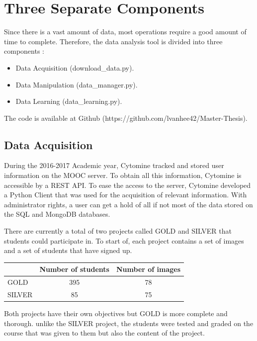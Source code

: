 \documentclass[a4paper,11pt]{report}
\numberwithin{figure}{section} %
\begin{document}
    \section{Three Separate Components}
    	Since there is a vast amount of data, most operations require a good amount of time to complete.
    	Therefore, the data analysis tool is divided into three components :
        \begin{itemize}
        \item[\textbullet] Data Acquisition (download\_data.py).
        \item[\textbullet] Data Manipulation (data\_manager.py).
        \item[\textbullet] Data Learning (data\_learning.py).
        \end{itemize}

        The code is available at Github (https://github.com/lvanhee42/Master-Thesis).

		\subsection{Data Acquisition}

			During the 2016-2017 Academic year, Cytomine tracked and stored user information on the MOOC server.
			To obtain all this information, Cytomine is accessible by a REST API. To ease the access to the server, Cytomine developed a Python Client that was used for the acquisition of relevant information.
			With administrator rights, a user can get a hold of all if not most of the data stored on the SQL and MongoDB databases.

          There are currently a total of two projects called GOLD and SILVER that students could participate in.
          To start of, each project contains a set of images and a set of students that have signed up.

          \begin{center}
          \begin{tabular}{| l | c | c |}
          \hline
           & Number of students & Number of images \\ \hline
           GOLD & 395 & 78 \\ \hline
           SILVER & 85 & 75 \\
          \hline
          \end{tabular}
          \end{center}

		  Both projects have their own objectives but GOLD is more complete and thorough.
		  unlike the SILVER project, the students were tested and graded on the course that was given to them but also the content of the project.
\end{document}
